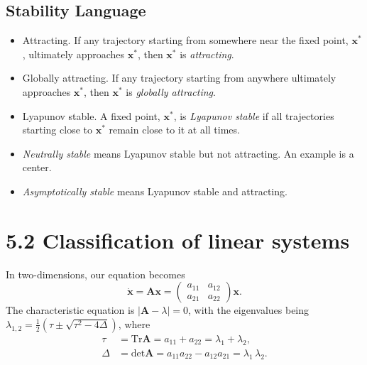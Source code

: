 \documentclass{book}
\begin{document}
\subsection{Stability Language}


\begin{itemize}

\item
Attracting.
If any trajectory starting from somewhere near the fixed point, $\mathbf x^*$, ultimately approaches $\mathbf x^*$, then $\mathbf x^*$ is \emph{attracting}.

\item
Globally attracting.
If any trajectory starting from anywhere ultimately approaches $\mathbf x^*$, then $\mathbf x^*$ is \emph{globally attracting}.

\item
Lyapunov stable.
A fixed point, $\mathbf x^*$, is \emph{Lyapunov stable} if all trajectories starting close to $\mathbf x^*$ remain close to it at all times.

\item
\emph{Neutrally stable} means Lyapunov stable but not attracting.  An example is a center.

\item
\emph{Asymptotically stable} means Lyapunov stable and attracting.

\end{itemize}




\section{5.2 Classification of linear systems}


In two-dimensions, our equation becomes
\begin{equation}
  \mathbf {\dot x}
  = \mathbf A \mathbf x
  = \left(
    \begin{array}{cc}
      a_{11} & a_{12} \\
      a_{21} & a_{22}
    \end{array}
  \right)
  \mathbf x.
\end{equation}
The characteristic equation is
$|\mathbf A - \lambda| = 0$,
with the eigenvalues being
$\lambda_{1,2} = \frac 1 2 \left(\tau \pm \sqrt{\tau^2 -  4 \Delta} \right)$,
where
$$
\begin{aligned}
  \tau &= \mathrm{Tr} \mathbf A = a_{11} + a_{22} = \lambda_1 + \lambda_2, \\
  \Delta &= \mathrm{det} \mathbf A = a_{11} a_{22} - a_{12} a_{21} = \lambda_1 \, \lambda_2.
\end{aligned}
$$
\end{document}
